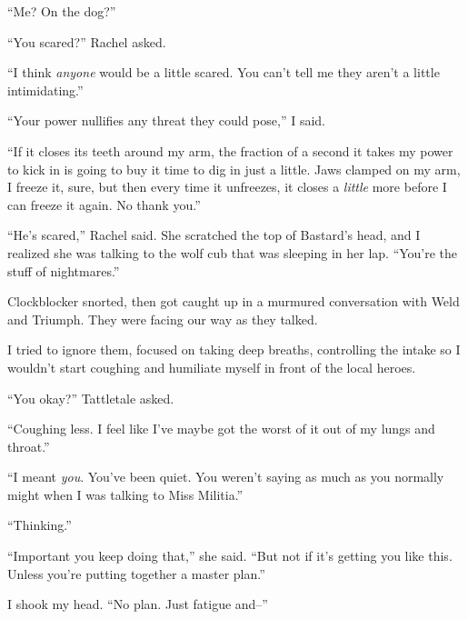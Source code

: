 ``Me?  On the dog?''



``You scared?'' Rachel asked.



``I think \emph{anyone} would be a little scared.  You can't tell me they aren't a little intimidating.''



``Your power nullifies any threat they could pose,'' I said.



``If it closes its teeth around my arm, the fraction of a second it takes my power to kick in is going to buy it time to dig in just a little.  Jaws clamped on my arm, I freeze it, sure, but then every time it unfreezes, it closes a \emph{little} more before I can freeze it again.  No thank you.''



``He's scared,'' Rachel said.  She scratched the top of Bastard's head, and I realized she was talking to the wolf cub that was sleeping in her lap.  ``You're the stuff of nightmares.''



Clockblocker snorted, then got caught up in a murmured conversation with Weld and Triumph.  They were facing our way as they talked.



I tried to ignore them, focused on taking deep breaths, controlling the intake so I wouldn't start coughing and humiliate myself in front of the local heroes.



``You okay?'' Tattletale asked.



``Coughing less.  I feel like I've maybe got the worst of it out of my lungs and throat.''



``I meant \emph{you}.  You've been quiet.  You weren't saying as much as you normally might when I was talking to Miss Militia.''



``Thinking.''



``Important you keep doing that,'' she said.  ``But not if it's getting you like this.  Unless you're putting together a master plan.''



I shook my head.  ``No plan.  Just fatigue and--''



